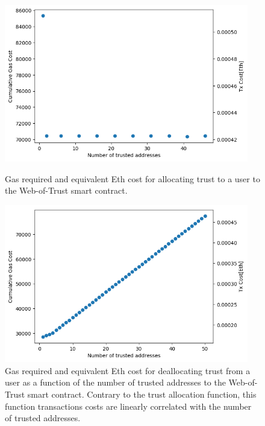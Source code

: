 {{{\begin{figure}[htb!]
\centering
\includegraphics[width=0.95\textwidth]{./pics/endorse_trust.png}
\caption[test]{Gas required and equivalent Eth cost for allocating trust to a user to the Web-of-Trust smart contract.}
\label{fig:addTrustGas}
\includegraphics[width=0.95\textwidth]{./pics/revoke_trust.png}
\caption{Gas required and equivalent Eth cost for deallocating trust from a user as a function of the number of trusted addresses to the Web-of-Trust smart contract. Contrary to the trust allocation function, this function transactions costs are linearly correlated with the number of trusted addresses.}
\label{fig:rmTrustGas}
\end{figure}

}}}
